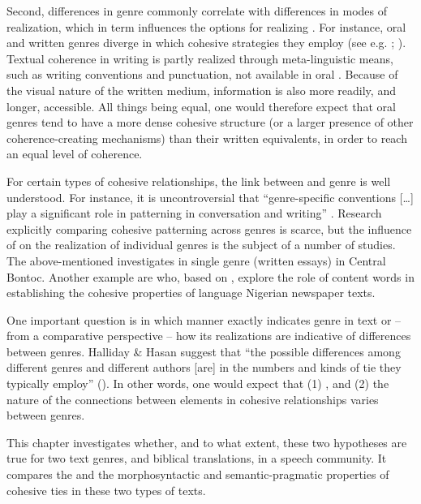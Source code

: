\documentclass[output=paper
,modfonts
,nonflat]{langsci/langscibook}
\begin{document}
Second, differences in genre commonly correlate with differences in modes of realization, which in term influences the options for realizing . For instance, oral and written genres diverge in which cohesive strategies they employ (see e.g. \citealt{Fox1987}; \citealt{Givón1993}). Textual coherence in writing is partly realized through meta-linguistic means, such as writing conventions and punctuation, not available in oral . Because of the visual nature of the written medium, information is also more readily, and longer, accessible. All things being equal, one would therefore expect that oral genres tend to have a more dense cohesive structure (or a larger presence of other coherence-creating mechanisms) than their written equivalents, in order to reach an equal level of coherence.

For certain types of cohesive relationships, the link between  and genre is well understood. For instance, it is uncontroversial that “genre-specific conventions […] play a significant role in  patterning in conversation and writing” \citep[2]{Fox1987}. Research explicitly comparing cohesive patterning across genres is scarce, but the influence of  on the realization of individual genres is the subject of a number of studies. The above-mentioned \citet{Benn1991} investigates  in single genre (written essays) in Central Bontoc. Another example are \citet{Malah2016} who, based on \citet{Hoey1991}, explore the role of content words in establishing the cohesive properties of  language Nigerian newspaper texts.

One important question is in which manner exactly  indicates genre in text or – from a comparative perspective – how its realizations are indicative of differences between genres. Halliday \& Hasan suggest that “the possible differences among different genres and different authors [are] in the numbers and kinds of tie they typically employ” (\citealt[4]{Halliday1976}). In other words, one would expect that (1) , and (2) the nature of the connections between elements in cohesive relationships varies between genres.

This chapter investigates whether, and to what extent, these two hypotheses are true for two text genres,  and biblical translations, in a  speech community. It compares the  and the morphosyntactic and semantic-pragmatic properties of cohesive ties in these two types of texts.
\end{document}
